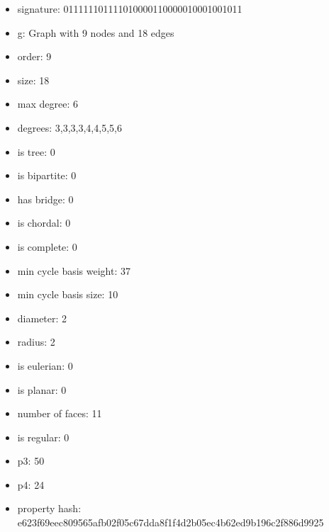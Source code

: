 \newpage
\begin{figure}
\end{figure}
\begin{itemize}
\item signature: 011111101111010000110000010001001011
\item g: Graph with 9 nodes and 18 edges
\item order: 9
\item size: 18
\item max degree: 6
\item degrees: 3,3,3,3,4,4,5,5,6
\item is tree: 0
\item is bipartite: 0
\item has bridge: 0
\item is chordal: 0
\item is complete: 0
\item min cycle basis weight: 37
\item min cycle basis size: 10
\item diameter: 2
\item radius: 2
\item is eulerian: 0
\item is planar: 0
\item number of faces: 11
\item is regular: 0
\item p3: 50
\item p4: 24
\item property hash: e623f69eec809565afb02f05c67dda8f1f4d2b05ec4b62ed9b196c2f886d9925
\end{itemize}
